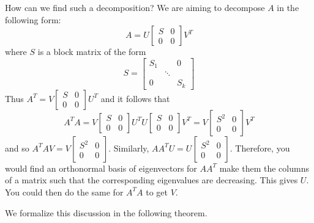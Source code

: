 \documentclass{ximera}
\begin{document}
How can we find such a decomposition? We are aiming to decompose $A$ in the following form:
\begin{equation*}
A=U\left[
\begin{array}{cc}
S & 0 \\
0 & 0
\end{array}
\right] V^T
\end{equation*}
where $S $ is a block matrix of the form
\[
S =\left[
\begin{array}{ccc}
S _{1} &  & 0 \\
& \ddots &  \\
0 &  & S _{k}
\end{array}
\right]
\]
Thus $A^T=V\left[
\begin{array}{cc}
S & 0 \\
0 & 0
\end{array}
\right] U^T$ and it follows that
\begin{equation*}
A^TA=V\left[
\begin{array}{cc}
S & 0 \\
0 & 0
\end{array}
\right] U^TU\left[
\begin{array}{cc}
S & 0 \\
0 & 0
\end{array}
\right] V^T=V\left[
\begin{array}{cc}
S ^{2} & 0 \\
0 & 0
\end{array}
\right] V^T
\end{equation*}
and so $A^TAV=V\left[
\begin{array}{cc}
S ^{2} & 0 \\
0 & 0
\end{array}
\right] .$ Similarly, $AA^TU=U\left[
\begin{array}{cc}
S ^{2} & 0 \\
0 & 0
\end{array}
\right] .$ Therefore, you would find an orthonormal basis of eigenvectors
for $AA^T$ make them the columns of a matrix such that the
corresponding eigenvalues are decreasing. This gives $U.$ You could then do
the same for $A^TA$ to get $V$.
 
We formalize this discussion in the following theorem.
 
\end{document}
